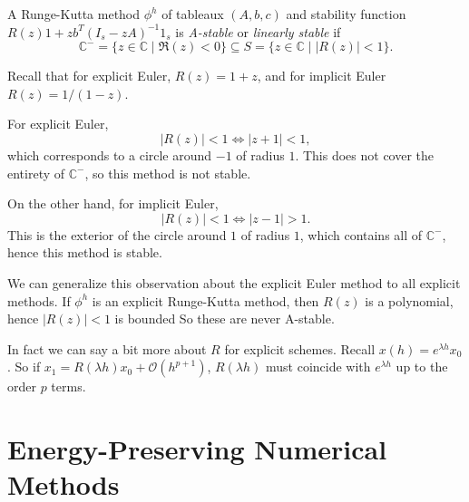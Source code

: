\documentclass[12pt]{article}
\begin{document}
\begin{definition}
	A Runge-Kutta method $\phi^{h}$ of tableaux $(A, b, c)$ and stability function $R(z)  1 + zb^{T}(I_s - z A)^{-1} 1_s$ is \emph{A-stable} or \emph{linearly stable} if
	\[
		\mathbb{C}^{-} = \{z \in \mathbb{C} \mid \Re(z) < 0\} \subseteq S = \{z \in \mathbb{C} \mid |R(z)| < 1\}.
	\]
\end{definition}

\begin{exbox}
	Recall that for explicit Euler, $R(z) = 1 + z$, and for implicit Euler $R(z) = 1/(1-z)$.

	For explicit Euler,
	\[
	|R(z)| < 1 \iff |z + 1 | < 1,
	\]
	which corresponds to a circle around $-1$ of radius $1$. This does not cover the entirety of $\mathbb{C}^{-}$, so this method is not stable.

	On the other hand, for implicit Euler,
	\[
	|R(z)| < 1 \iff |z - 1| > 1.
	\]
	This is the exterior of the circle around $1$ of radius $1$, which contains all of $\mathbb{C}^{-}$, hence this method is stable.
\end{exbox}

We can generalize this observation about the explicit Euler method to all explicit methods. If $\phi^{h}$ is an explicit Runge-Kutta method, then $R(z)$ is a polynomial, hence $|R(z)| < 1$ is bounded So these are never A-stable.

In fact we can say a bit more about $R$ for explicit schemes. Recall $x(h) = e^{\lambda h} x_0$. So if $x_1 = R(\lambda h) x_0 + \mathcal{O}(h^{p+1})$, $R(\lambda h)$ must coincide with $e^{\lambda h}$ up to the order $p$ terms.

\newpage

\section{Energy-Preserving Numerical Methods}%
\label{sec:epnm}
\end{document}
